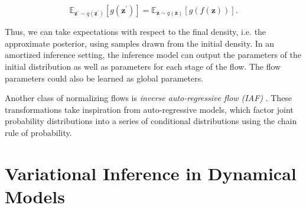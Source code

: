 \begin{equation}
	\mathbb{E}_{\mathbf{z}^\prime \sim q (\mathbf{z}^\prime)} \left[ g(\mathbf{z}^\prime) \right] = \mathbb{E}_{\mathbf{z} \sim q (\mathbf{z})} \left[ g( f (\mathbf{z})) \right].
\end{equation}

\noindent Thus, we can take expectations with respect to the final density, i.e. the approximate posterior, using samples drawn from the initial density. In an amortized inference setting, the inference model can output the parameters of the initial distribution as well as parameters for each stage of the flow. The flow parameters could also be learned as global parameters.


Another class of normalizing flows is \textit{inverse auto-regressive flow (IAF)} \cite{kingma2016improved}. These transformations take inspiration from auto-regressive models, which factor joint probability distributions into a series of conditional distributions using the chain rule of probability.


\section{Variational Inference in Dynamical Models}
\label{sec: variational inference in dynamical models}

